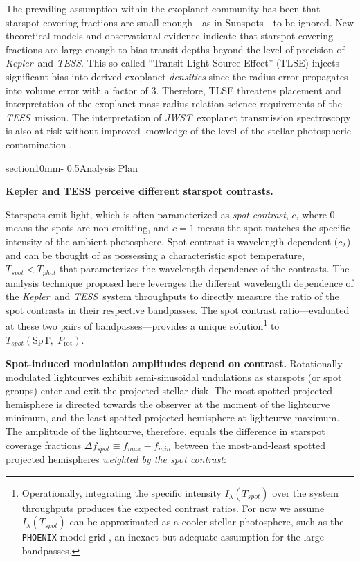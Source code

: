 \documentclass[letterpaper,11pt]{article}
\makeatletter
\renewcommand{\section}{\@startsection%
{section}{1}{0mm}{-\baselineskip}%
{0.5\baselineskip}{\normalfont\Large\bfseries}}%
\newcommand{\tess}{{\it TESS}}
\newcommand{\jwst}{{\it JWST}}
\newcommand{\kepler}{{\it Kepler}}
\makeatother
\begin{document}
The prevailing assumption within the exoplanet community has been that starspot covering fractions are small enough---as in Sunspots---to be ignored.  New theoretical models \citep{2018ApJ...853..122R} and observational evidence \citep{2016MNRAS.463.2494F} indicate that starspot covering fractions are large enough to bias transit depths beyond the level of precision of \kepler\ and \tess.  This so-called ``Transit Light Source Effect'' (TLSE) injects significant bias into derived exoplanet \emph{densities} since the radius error propagates into volume error with a factor of 3.  Therefore, TLSE threatens placement and interpretation of the exoplanet mass-radius relation science requirements of the \tess\ mission.  The interpretation of \jwst\ exoplanet transmission spectroscopy is also at risk without improved knowledge of the level of the stellar photospheric contamination \citep{2019AJ....157...11W}.

\section{Analysis Plan}

\textbf{Kepler and TESS perceive different starspot contrasts.}

Starspots emit light, which is often parameterized as \emph{spot contrast}, $c$, where 0 means the spots are non-emitting, and $c=1$ means the spot matches the specific intensity of the ambient photosphere.  Spot contrast is wavelength dependent ($c_\lambda$) and can be thought of as possessing a characteristic spot temperature, $T_{spot}<T_{phot}$ that parameterizes the wavelength dependence of the contrasts.  The analysis technique proposed here leverages the different wavelength dependence of the \kepler\ and \tess\ system throughputs to directly measure the ratio of the spot contrasts in their respective bandpasses.  The spot contrast ratio---evaluated at these two pairs of bandpasses---provides a unique solution\footnote{Operationally, integrating the specific intensity $I_\lambda(T_{spot})$ over the system throughputs produces the expected contrast ratios.  For now we assume $I_\lambda(T_{spot})$ can be approximated as a cooler stellar photosphere, such as the \texttt{PHOENIX} model grid \citep{2013A&A...553A...6H}, an inexact but adequate assumption for the large bandpasses.} to $T_{spot}(\mathrm{SpT},\;P_{\mathrm{rot}})$.

\textbf{Spot-induced modulation amplitudes depend on contrast.}
Rotationally-modulated lightcurves exhibit semi-sinusoidal undulations as starspots (or spot groups) enter and exit the projected stellar disk.  The most-spotted projected hemisphere is directed towards the observer at the moment of the lightcurve minimum, and the least-spotted projected hemisphere at lightcurve maximum.  The amplitude of the lightcurve, therefore, equals the difference in starspot coverage fractions $\Delta f_{spot} \equiv f_{max}-f_{min}$ between the most-and-least spotted projected hemispheres \emph{weighted by the spot contrast}:
\end{document}
